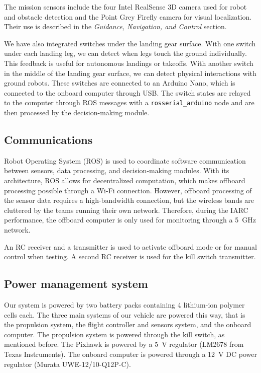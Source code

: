 The mission sensors include the four Intel RealSense 3D camera used for robot and obstacle detection and the Point Grey Firefly camera for visual localization. Their use is described in the \textit{Guidance, Navigation, and Control} section.

We have also integrated switches under the landing gear surface. With one switch under each landing leg, we can detect when legs touch the ground individually. This feedback is useful for autonomous landings or takeoffs. With another switch in the middle of the landing gear surface, we can detect physical interactions with ground robots. These switches are connected to an Arduino Nano, which is connected to the onboard computer through USB. The switch states are relayed to the computer through ROS messages with a \texttt{rosserial\_arduino} node and are then processed by the decision-making module.

\subsection*{Communications} \label{subsec:payload-comm}

Robot Operating System (ROS) is used to coordinate software communication between sensors, data processing, and decision-making modules. With its architecture, ROS allows for decentralized computation, which makes offboard processing possible through a Wi-Fi connection. However, offboard processing of the sensor data requires a high-bandwidth connection, but the wireless bands are cluttered by the teams running their own network. Therefore, during the IARC performance, the offboard computer is only used for monitoring through a 5~GHz network.

An RC receiver and a transmitter is used to activate offboard mode or for manual control when testing. A second RC receiver is used for the kill switch transmitter.

\subsection*{Power management system} \label{subsec:payload-power}

Our system is powered by two battery packs containing 4 lithium-ion polymer cells each. The three main systems of our vehicle are powered this way, that is the propulsion system, the flight controller and sensors system, and the onboard computer. The propulsion system is powered through the kill switch, as mentioned before. The Pixhawk is powered by a 5~V regulator (LM2678 from Texas Instruments). The onboard computer is powered through a 12~V DC power regulator (Murata UWE-12/10-Q12P-C).
